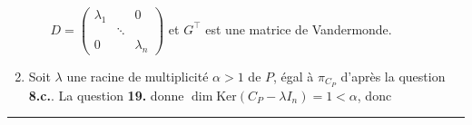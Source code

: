 \documentclass[a4paper,11pt]{article}
\newcommand{\fin}{
	\begin{center}
	\vspace*{2em}
	{\color{vert1}\rule{5cm}{0.2pt}}\\
	\vspace*{1em}
			\sffamily\bfseries{\color{vert1}{FIN DU CORRIGÉ}}
	\end{center}
	}
\begin{document}
\begin{enumerate}
\begin{enumerate}
\begin{center}
{$D=\begin{pmatrix}
\lambda_1&&0\\
&\ddots\\
0&&\lambda_n
\end{pmatrix}$ et $G^\top$ est une matrice de Vandermonde.}
\end{center}
\end{enumerate}
\item Soit $\lambda$ une racine de multiplicité $\alpha>1$ de $P$, égal à $\pi_{C_P}$ d'après la question {\sffamily\bfseries 8.c.}. La question {\sffamily\bfseries 19.} donne $\dim\mathrm{Ker}(C_P-\lambda I_n)=1<\alpha$, donc
\begin{center}
\end{center}
\end{enumerate}

\fin
\end{document}
